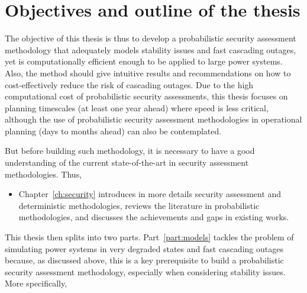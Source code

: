 \section{Objectives and outline of the thesis}

The objective of this thesis is thus to develop a probabilistic security assessment methodology that adequately models stability issues and fast cascading outages, yet is computationally efficient enough to be applied to large power systems. Also, the method should give intuitive results and recommendations on how to cost-effectively reduce the risk of cascading outages. Due to the high computational cost of probabilistic security assessments, this thesis focuses on planning timescales (at least one year ahead) where speed is less critical, although the use of probabilistic security assessment methodologies in operational planning (days to months ahead) can also be contemplated.

But before building such methodology, it is necessary to have a good understanding of the current state-of-the-art in security assessment methodologies. Thus,

\begin{itemize}
    \item Chapter~\ref{ch:security} introduces in more details security assessment and deterministic methodologies, reviews the literature in probabilistic methodologies, and discusses the achievements and gaps in existing works.
\end{itemize}

This thesis then splits into two parts. Part~\ref{part:models} tackles the problem of simulating power systems in very degraded states and fast cascading outages because, as discussed above, this is a key prerequisite to build a probabilistic security assessment methodology, especially when considering stability issues. More specifically,

